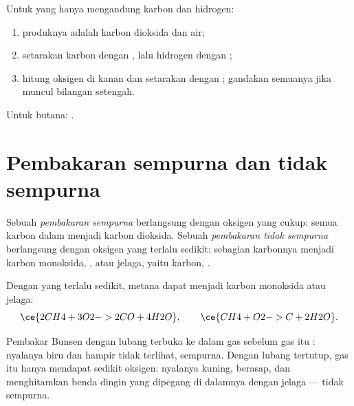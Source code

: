 \begin{method}\label{met:g8:combustion-and-fuels:write}
Untuk  yang  hanya mengandung karbon dan hidrogen:
\begin{enumerate}
  \item produknya adalah karbon dioksida dan air;
  \item setarakan karbon dengan , lalu hidrogen dengan ;
  \item hitung  oksigen di kanan dan setarakan dengan ;
        gandakan semuanya jika muncul bilangan setengah.
\end{enumerate}
Untuk butana: .
\end{method}

\section{Pembakaran sempurna dan tidak sempurna}

\begin{definition}\label{def:g8:combustion-and-fuels:complete}
Sebuah \emph{pembakaran sempurna} berlangsung
dengan oksigen yang cukup: semua karbon dalam  menjadi karbon
dioksida. Sebuah
\emph{pembakaran tidak sempurna}
berlangsung dengan oksigen yang terlalu sedikit: sebagian karbonnya
menjadi karbon monoksida, , atau jelaga, yaitu karbon, .
\end{definition}

\begin{example}\label{ex:g8:combustion-and-fuels:incomplete}
Dengan  yang terlalu sedikit, metana dapat  menjadi karbon
monoksida atau jelaga:
\[
  \ce{2CH4 + 3O2 -> 2CO + 4H2O}, \qquad \ce{CH4 + O2 -> C + 2H2O}.
\]
\end{example}

\begin{proposition}\label{prop:g8:combustion-and-fuels:flame}
Pembakar Bunsen dengan lubang  terbuka   ke dalam
gas sebelum gas itu : nyalanya biru dan hampir tidak terlihat,
 sempurna. Dengan lubang  tertutup, gas itu hanya
mendapat sedikit oksigen: nyalanya kuning, berasap, dan menghitamkan
benda dingin yang dipegang di dalamnya dengan jelaga --- 
tidak sempurna.
\end{proposition}

